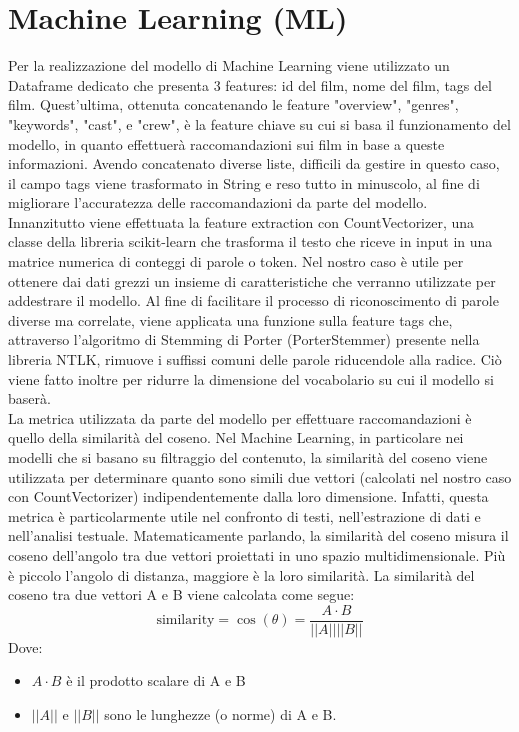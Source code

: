 \documentclass{report}
\begin{document}
    \section{Machine Learning (ML)}
        Per la realizzazione del modello di Machine Learning viene utilizzato un Dataframe dedicato che presenta 3 features: id del film, nome del film, tags del film. Quest'ultima, ottenuta concatenando le feature "overview", "genres", "keywords", "cast", e "crew", è la feature chiave su cui si basa il funzionamento del modello, in quanto effettuerà raccomandazioni sui film in base a queste informazioni. Avendo concatenato diverse liste, difficili da gestire in questo caso, il campo tags viene trasformato in String e reso tutto in minuscolo, al fine di migliorare l'accuratezza delle raccomandazioni da parte del modello. \\
        Innanzitutto viene effettuata la feature extraction con CountVectorizer, una classe della libreria scikit-learn che trasforma il testo che riceve in input in una matrice numerica di conteggi di parole o token. Nel nostro caso è utile per ottenere dai dati grezzi un insieme di caratteristiche che verranno utilizzate per addestrare il modello. Al fine di facilitare il processo di riconoscimento di parole diverse ma correlate, viene applicata una funzione sulla feature tags che, attraverso l'algoritmo di Stemming di Porter (PorterStemmer) presente nella libreria NTLK, rimuove i suffissi comuni delle parole riducendole alla radice. Ciò viene fatto inoltre per ridurre la dimensione del vocabolario su cui il modello si baserà.\\
        La metrica utilizzata da parte del modello per effettuare raccomandazioni è quello della similarità del coseno. Nel Machine Learning, in particolare nei modelli che si basano su filtraggio del contenuto, la similarità del coseno viene utilizzata per determinare quanto sono simili due vettori (calcolati nel nostro caso con CountVectorizer) indipendentemente dalla loro dimensione. Infatti, questa metrica è particolarmente utile nel confronto di testi, nell’estrazione di dati e nell’analisi testuale. Matematicamente parlando, la similarità del coseno misura il coseno dell’angolo tra due vettori proiettati in uno spazio multidimensionale. Più è piccolo l'angolo di distanza, maggiore è la loro similarità. La similarità del coseno tra due vettori A e B viene calcolata come segue:
        \[ \text{{similarity}} = \cos(\theta) = \frac{{A \cdot B}}{{||A|| ||B||}} \]
        Dove:
        \begin{itemize}
            \item $A \cdot B$ è il prodotto scalare di A e B
            \item $||A||$ e $||B||$ sono le lunghezze (o norme) di A e B.
        \end{itemize}
\end{document}
